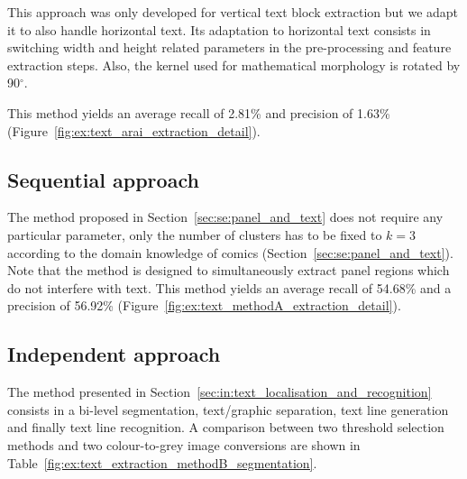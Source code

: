 This approach was only developed for vertical text block extraction but we adapt it to also handle horizontal text.
Its adaptation to horizontal text consists in switching width and height related parameters in the pre-processing and feature extraction steps.
Also, the kernel used for mathematical morphology is rotated by 90$^{\circ}$.

This method yields an average recall of 2.81\% and precision of 1.63\% (Figure~\ref{fig:ex:text_arai_extraction_detail}).

\subsection{Sequential approach} %
The method proposed in Section~\ref{sec:se:panel_and_text} does not require any particular parameter, only the number of clusters has to be fixed to $k=3$ according to the domain knowledge of comics (Section~\ref{sec:se:panel_and_text}).
Note that the method is designed to simultaneously extract panel regions which do not interfere with text.
This method yields an average recall of 54.68\% and a precision of 56.92\% (Figure~\ref{fig:ex:text_methodA_extraction_detail}).



\subsection{Independent approach} %
\label{sub:ex:text_extraction_evaluation_method_b}

The method presented in Section~\ref{sec:in:text_localisation_and_recognition} consists in a bi-level segmentation, text/graphic separation, text line generation and finally text line recognition.
A comparison between two threshold selection methods and two colour-to-grey image conversions are shown in Table~\ref{fig:ex:text_extraction_methodB_segmentation}.


